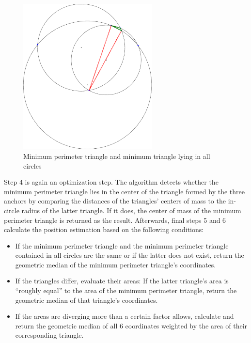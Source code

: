 \begin{figure}[h]
\begin{center}
\includegraphics[width=7cm]{img/geostep3}
\end{center}
\caption{Minimum perimeter triangle and minimum triangle lying in all circles}
\label{fig:geostep3}
\end{figure}

Step 4 is again an optimization step. The algorithm detects whether the minimum perimeter triangle lies in the center of the triangle formed by the three anchors by comparing the distances of the triangles' centers of mass to the in-circle radius of the latter triangle. If it does, the center of mass of the minimum perimeter triangle is returned as the result. Afterwards, final steps 5 and 6 calculate the position estimation based on the following conditions:
\begin{itemize}
\item If the minimum perimeter triangle and the minimum perimeter triangle contained in all circles are the same or if the latter does not exist, return the geometric median of the minimum perimeter triangle's coordinates.
\item If the triangles differ, evaluate their areas: If the latter triangle's area is ``roughly equal'' to the area of the minimum perimeter triangle, return the geometric median of that triangle's coordinates.
\item If the areas are diverging more than a certain factor allows, calculate and return the geometric median of all 6 coordinates weighted by the area of their corresponding triangle.
\end{itemize}


